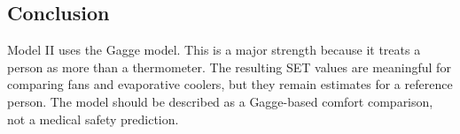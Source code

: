 
\subsection{Conclusion}
 
Model II uses the Gagge model. This is a major strength because it treats a person as more than a thermometer. The resulting SET values are meaningful for comparing fans and evaporative coolers, but they remain estimates for a reference person. The model should be described as a Gagge-based comfort comparison, not a medical safety prediction.